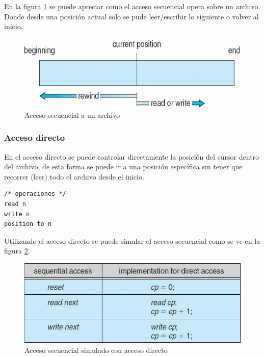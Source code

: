 En la figura \ref{fig:acceso_secuencial} se puede apreciar como el acceso
secuencial opera sobre un archivo. Donde desde una posición actual solo se pude
leer/escribir lo siguiente o volver al inicio.

\begin{figure}[htbp]
\centering
\includegraphics[scale=0.5]{img/C08_disco/acceso_secuencial.png}
\caption{Acceso secuencial a un archivo}
\label{fig:acceso_secuencial}
\end{figure}

\subsubsection{Acceso directo}
En el acceso directo se puede controlar directamente la posición del cursor
dentro del archivo, de esta forma se puede ir a una posición específica sin
tener que recorrer (leer) todo el archivo desde el inicio.

\begin{verbatim}
/* operaciones */
read n
write n
position to n
\end{verbatim}

Utilizando el acceso directo se puede simular el acceso secuencial como se ve en
la figura \ref{fig:acceso_secuencial_simulado}.

\begin{figure}[htbp]
\centering
\includegraphics[scale=0.5]{img/C08_disco/acceso_secuencial_simulado.png}
\caption{Acceso secuencial simulado con acceso directo}
\label{fig:acceso_secuencial_simulado}
\end{figure}

